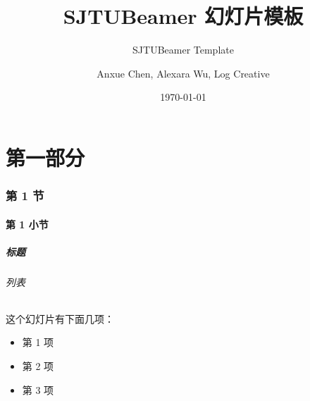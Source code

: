 \documentclass[
    aspectratio=169,		       %
]{ctexbeamer}
\begin{document}
\title{SJTUBeamer 幻灯片模板}  %
\subtitle{SJTUBeamer Template}	       %
\author{Anxue Chen, Alexara Wu, Log Creative}
\date{\today}			       %
\maketitle			       %

\part{第一部分}


\AtBeginSubsection[]{		       %
  \begin{frame}
    \subsectionpage		   %
  \end{frame}
}

\section{第 1 节}
\subsection{第 1 小节}

\begin{frame}
  \frametitle{标题}

  \paragraph{列表} 这个\alert{幻灯片}有下面几项：

  \begin{itemize}
    \item 第 1 项
    \item 第 2 项
    \item 第 3 项
  \end{itemize}

\end{frame}
\end{document}
